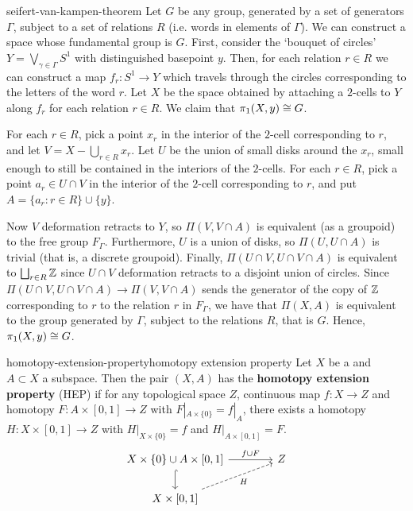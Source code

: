 \begin{example}{seifert-van-kampen-theorem}
    Let $G$ be any group, generated by a set of generators $\Gamma$, subject to a set of relations $R$ (i.e. words in elements of $\Gamma$). We can construct a space whose fundamental group is $G$. First, consider the `bouquet of circles' $Y = \bigvee_{\gamma \in \Gamma} S^1$ with distinguished basepoint $y$. Then, for each relation $r \in R$ we can construct a map $f_r : S^1 \to Y$ which travels through the circles corresponding to the letters of the word $r$. Let $X$ be the space obtained by attaching a $2$-cells to $Y$ along $f_r$ for each relation $r \in R$. We claim that $\pi_1(X, y) \cong G$.
    
    For each $r \in R$, pick a point $x_r$ in the interior of the $2$-cell corresponding to $r$, and let $V = X - \bigcup_{r \in R} x_r$. Let $U$ be the union of small disks around the $x_r$, small enough to still be contained in the interiors of the $2$-cells. For each $r \in R$, pick a point $a_r \in U \cap V$ in the interior of the $2$-cell corresponding to $r$, and put $A = \{ a_r : r \in R \} \cup \{ y \}$.
    
    Now $V$ deformation retracts to $Y$, so $\Pi(V, V \cap A)$ is equivalent (as a groupoid) to the free group $F_\Gamma$. Furthermore, $U$ is a union of disks, so $\Pi(U, U \cap A)$ is trivial (that is, a discrete groupoid). Finally, $\Pi(U \cap V, U \cap V \cap A)$ is equivalent to $\bigsqcup_{r \in R} \mathbb{Z}$ since $U \cap V$ deformation retracts to a disjoint union of circles. Since $\Pi(U \cap V, U \cap V \cap A) \to \Pi(V, V \cap A)$ sends the generator of the copy of $\mathbb{Z}$ corresponding to $r$ to the relation $r$ in $F_\Gamma$, we have that $\Pi(X, A)$ is equivalent to the group generated by $\Gamma$, subject to the relations $R$, that is $G$. Hence, $\pi_1(X, y) \cong G$.
\end{example}

\begin{topic}{homotopy-extension-property}{homotopy extension property}
    Let $X$ be a  and $A \subset X$ a subspace. Then the pair $(X, A)$ has the \textbf{homotopy extension property} (HEP) if for any topological space $Z$, continuous map $f : X \to Z$ and homotopy $F : A \times [0, 1] \to Z$ with $F|_{A \times \{ 0 \}} = f|_A$, there exists a homotopy $H : X \times [0, 1] \to Z$ with $H|_{X \times \{ 0 \}} = f$ and $H|_{A \times [0, 1]} = F$.
    \[ \begin{tikzcd}[column sep=4em]
        X \times \{ 0 \} \cup A \times [0, 1] \arrow[hookrightarrow]{d} \arrow{r}{f \cup F} & Z \\ X \times [0, 1] \arrow[swap, dashed]{ur}{H} &
    \end{tikzcd} \]
\end{topic}

